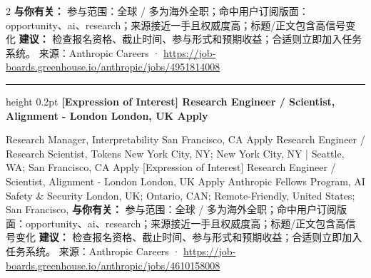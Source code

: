 \documentclass[10.5pt]{ctexart}
\begin{document}
\begin{multicols}{2}
\textbf{与你有关：} 参与范围：全球 / 多为海外全职；命中用户订阅版面：opportunity、ai、research；来源接近一手且权威度高；标题/正文包含高信号变化
\textbf{建议：} 检查报名资格、截止时间、参与形式和预期收益；合适则立即加入任务系统。
{\footnotesize\color{ormuted} 来源：Anthropic Careers · \url{https://job-boards.greenhouse.io/anthropic/jobs/4951814008}}
\vspace{2mm}
\hrule height 0.2pt
\vspace{2mm}
{\large\bfseries [Expression of Interest] Research Engineer / Scientist, Alignment - London London, UK Apply}\par
[Expression of Interest] Research Manager, Interpretability San Francisco, CA Apply Research Engineer / Research Scientist, Tokens New York City, NY; New York City, NY | Seattle, WA; San Francisco, CA Apply [Expression of Interest] Research Engineer / Scientist, Alignment - London London, UK Apply Anthropic Fellows Program, AI Safety \& Security London, UK; Ontario, CAN; Remote-Friendly, United States; San Francisco, 
\textbf{与你有关：} 参与范围：全球 / 多为海外全职；命中用户订阅版面：opportunity、ai、research；来源接近一手且权威度高；标题/正文包含高信号变化
\textbf{建议：} 检查报名资格、截止时间、参与形式和预期收益；合适则立即加入任务系统。
{\footnotesize\color{ormuted} 来源：Anthropic Careers · \url{https://job-boards.greenhouse.io/anthropic/jobs/4610158008}}
\end{multicols}
\end{document}
